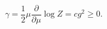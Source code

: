 \begin{equation}
\gamma =\frac{1}{2}\mu\frac{\partial}{\partial\mu}\log{Z}=cg^2 \ge 0 .
\label{eqn:pos_anodim}
\end{equation}

